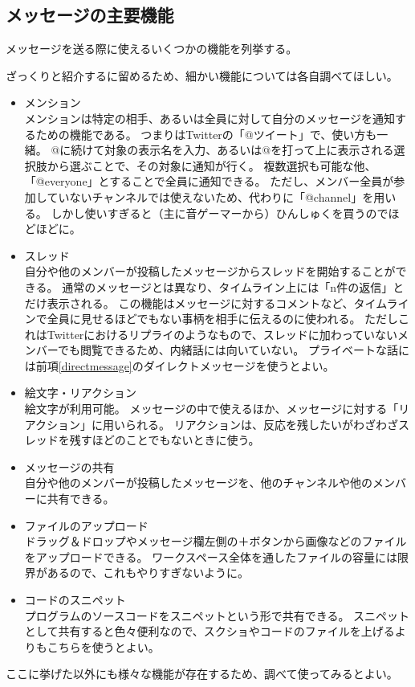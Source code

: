 \documentclass[lualatex,ja=standard,12pt,a4j]{bxjsbook}
\begin{document}
            \subsection{メッセージの主要機能}
            	メッセージを送る際に使えるいくつかの機能を列挙する。
                
                ざっくりと紹介するに留めるため、細かい機能については各自調べてほしい。
                
                \begin{itemize}
                	\item メンション\\
                    	メンションは特定の相手、あるいは全員に対して自分のメッセージを通知するための機能である。
                        つまりはTwitterの「@ツイート」で、使い方も一緒。
                        @に続けて対象の表示名を入力、あるいは@を打って上に表示される選択肢から選ぶことで、その対象に通知が行く。
                        複数選択も可能な他、「@everyone」とすることで全員に通知できる。
                        ただし、メンバー全員が参加していないチャンネルでは使えないため、代わりに「@channel」を用いる。
                        しかし使いすぎると（主に音ゲーマーから）ひんしゅくを買うのでほどほどに。
                    \item スレッド\\
                    	自分や他のメンバーが投稿したメッセージからスレッドを開始することができる。
                        通常のメッセージとは異なり、タイムライン上には「n件の返信」とだけ表示される。
                        この機能はメッセージに対するコメントなど、タイムラインで全員に見せるほどでもない事柄を相手に伝えるのに使われる。
                        ただしこれはTwitterにおけるリプライのようなもので、スレッドに加わっていないメンバーでも閲覧できるため、内緒話には向いていない。
                        プライベートな話には前項\ref{directmessage}のダイレクトメッセージを使うとよい。
                    \item 絵文字・リアクション\\
                    	絵文字が利用可能。
                        メッセージの中で使えるほか、メッセージに対する「リアクション」に用いられる。
                        リアクションは、反応を残したいがわざわざスレッドを残すほどのことでもないときに使う。
                    \item メッセージの共有\\
                    	自分や他のメンバーが投稿したメッセージを、他のチャンネルや他のメンバーに共有できる。
                    \item ファイルのアップロード\\
                    	ドラッグ＆ドロップやメッセージ欄左側の＋ボタンから画像などのファイルをアップロードできる。
                        ワークスペース全体を通したファイルの容量には限界があるので、これもやりすぎないように。
                    \item コードのスニペット\\
                    	プログラムのソースコードをスニペットという形で共有できる。
                        スニペットとして共有すると色々便利なので、スクショやコードのファイルを上げるよりもこちらを使うとよい。
                \end{itemize}
                
            	ここに挙げた以外にも様々な機能が存在するため、調べて使ってみるとよい。
\end{document}

